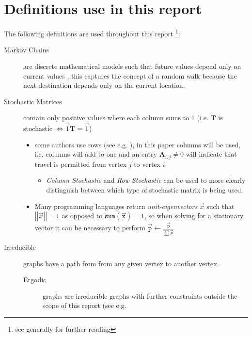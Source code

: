 \documentclass[11pt]{report}
\begin{document}
\section{Definitions use in this report}
\label{definitions}
The following definitions are used throughout this report \footnote{see generally \cite[Ch. 15]{langvilleGooglePageRankScience2012} for further reading}:

\begin{description}
\item[{Markov Chains}] are discrete mathematical models such that future values depend only on current values \cite[]{larsonElementaryLinearAlgebra1991}, this captures the concept of a random walk because the next destination depends only on the current location.
\item[{Stochastic Matrices}] contain only positive values where each column sums to 1 \cite{langvilleGooglePageRankScience2012,larsonElementaryLinearAlgebra1991} (i.e. \(\mathbf{T}\) is stochastic \(\iff \vec{1}\mathbf{T} = \vec{1}\))
\begin{itemize}
\item some authors use rows (see e.g. \cite[]{langvilleGooglePageRankScience2012}), in this paper columns will be used, i.e. columns will add to one and an entry \(\mathbf{A}_{i,j} \neq 0\) will indicate that travel is permitted from vertex \(j\) to vertex \(i\).
\begin{itemize}
\item \emph{Column Stochastic} and \emph{Row Stochastic} can be used to more clearly distinguish between which type of stochastic matrix is being used.
\end{itemize}
\item Many programming languages return \emph{unit-eigenvectors} \(\vec{x}\) such that \(\left\lvert \left\lvert \vec{x} \right\rvert \right\rvert = 1\) as opposed to \(\mathtt{sum} \left( \vec{\mathtt{x}}\right) = 1\), so when solving for a stationary vector it can be necessary to perform \(\vec{\mathtt{p}} \leftarrow \frac{\vec{\mathtt{p}}}{\sum \vec{p}}\)
\end{itemize}
\item[{Irreducible}] graphs have a path from from any given vertex to another vertex. \cite[]{langvilleGooglePageRankScience2012}
\begin{description}
\item[{Ergodic}] graphs are irreducible graphs with further constraints outside
the scope of this report (see e.g.

\end{description}
\end{description}
\end{document}
